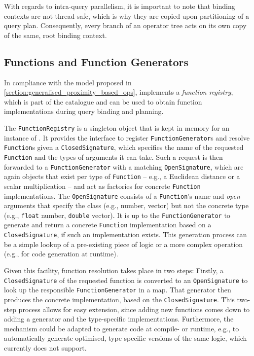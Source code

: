 With regards to intra-query parallelism, it is important to note that binding contexts are not thread-safe, which is why they are copied upon partitioning of a query plan. Consequently, every branch of an operator tree acts on its own copy of the same, root binding context.

\subsection{Functions and Function Generators}

In compliance with the model proposed in \cref{section:generalised_proximity_based_ops}, \cottontail{} implements a \emph{function registry}, which is part of the catalogue and can be used to obtain function implementations during query binding and planning.

The \texttt{FunctionRegistry} is a singleton object that is kept in memory for an instance of \cottontail{}. It provides the interface to register \texttt{FunctionGenerator}s and resolve \texttt{Function}s given a \texttt{ClosedSignature}, which specifies the name of the requested \texttt{Function} and the types of arguments it can take. Such a request is then forwarded to a \texttt{FunctionGenerator} with a matching \texttt{OpenSignature}, which are again objects that exist per type of \texttt{Function} -- e.g., a Euclidean distance or a scalar multiplication -- and act as factories for concrete \texttt{Function} implementations. The \texttt{OpenSignature} consists of a \texttt{Function}'s name and \emph{open} arguments that specify the class (e.g., number, vector) but not the concrete type (e.g., \texttt{float} number, \texttt{double} vector). It is up to the \texttt{FunctionGenerator} to generate and return a concrete \texttt{Function} implementation based on a \texttt{ClosedSignature}, if such an implementation exists. This generation process can be a simple lookup of a pre-existing piece of logic or a more complex operation (e.g., for code generation at runtime). 

Given this facility, function resolution takes place in two steps: Firstly, a \texttt{ClosedSignature} of the requested function is converted to an \texttt{OpenSignature} to look up the responsible \texttt{FunctionGenerator} in a map. That generator then produces the concrete implementation, based on the \texttt{ClosedSignature}. This two-step process allows for easy extension, since adding new functions comes down to adding a generator and the type-specific implementations. Furthermore, the mechanism could be adapted to generate code at compile- or runtime, e.g., to automatically generate optimised, type specific versions of the same logic, which \cottontail{} currently does not support.

